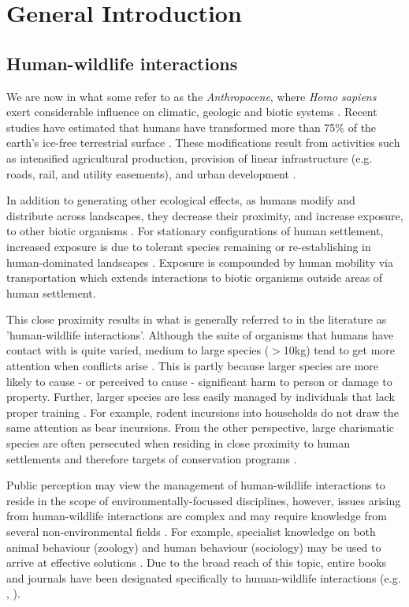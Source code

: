 \chapter{General Introduction}\label{sec:intro}
\newpage

\section{Human-wildlife interactions}

We are now in what some refer to as the \textit{Anthropocene}, where \textit{Homo sapiens} exert considerable influence on climatic, geologic and biotic systems \citep{crut06}. Recent studies have estimated that humans have transformed more than 75\% of the earth's ice-free terrestrial surface \citep{elli08}. These modifications result from activities such as intensified agricultural production, provision of linear infrastructure (e.g. roads, rail, and utility easements), and urban development \citep{vito97,sand02,fole05}.

In addition to generating other ecological effects, as humans modify and distribute across landscapes, they decrease their proximity, and increase exposure, to other biotic organisms \citep{}. For stationary configurations of human settlement, increased exposure is due to tolerant species remaining or re-establishing in human-dominated landscapes \citep{soul16}. Exposure is compounded by human mobility via transportation which extends interactions to biotic organisms outside areas of human settlement.

This close proximity results in what is generally referred to in the literature as 'human-wildlife interactions'. Although the suite of organisms that humans have contact with is quite varied, medium to large species ($>$10kg) tend to get more attention when conflicts arise \citep{seor16}. This is partly because larger species are more likely to cause - or perceived to cause - significant harm to person or damage to property. Further, larger species are less easily managed by individuals that lack proper training \citep{}. For example, rodent incursions into households do not draw the same attention as bear incursions. From the other perspective, large charismatic species are often persecuted when residing in close proximity to human settlements and therefore targets of conservation programs \citep{trev03}.

Public perception may view the management of human-wildlife interactions to reside in the scope of environmentally-focussed disciplines, however, issues arising from human-wildlife interactions are complex and may require knowledge from several non-environmental fields \citep{}. For example, specialist knowledge on both animal behaviour (zoology) and human behaviour (sociology) may be used to arrive at effective solutions \citep{dicka10}. Due to the broad reach of this topic, entire books and journals have been designated specifically to human-wildlife interactions (e.g. \cite{manf08}, \cite{}).

